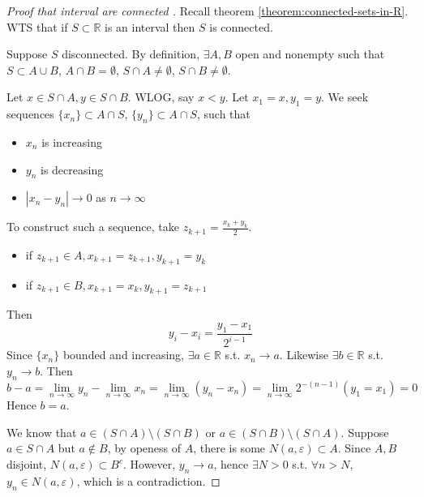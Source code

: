 \begin{proof}[Proof that interval are connected 
    \label{proof:connected-sets-in-R}]
    \medskip

    Recall theorem \ref{theorem:connected-sets-in-R}. 
    WTS that if $S \subset \mathbb{R}$ is an interval
    then $S$ is connected.
    \medskip

    Suppose $S$ disconnected. By definition, $\exists A, B$
    open and nonempty such that $S \subset A \cup B$,
    $A \cap B = \emptyset$,
    $S \cap A \neq \emptyset$,
    $S \cap B \neq \emptyset$.
    \medskip

    Let $x \in S \cap A, y \in S \cap B$. WLOG, say $x < y$.
    Let $x_1 = x, y_1 = y$. We seek sequences 
    $\{ x_n \} \subset A \cap S $,
    $\{ y_n \} \subset A \cap S $,
    such that 
    \begin{itemize}
        \item $x_n$ is increasing 
        \item $y_n$ is decreasing 
        \item $|x_n - y_n| \to 0$ as $n \to \infty$
    \end{itemize} 

    To construct such a sequence, take $z_{k + 1} = \frac{x_k + y_k}{2}$.
    \begin{itemize}
        \item if $z_{k + 1} \in A, x_{k + 1} = z_{k + 1}, y_{k + 1} = y_k$
        \item if $z_{k + 1} \in B, x_{k + 1} = x_k, y_{k + 1} = z_{k + 1}$
    \end{itemize} 
    Then 
    \[
        y_i - x_i = \frac{y_1 - x_1}{2^{i - 1}}
    \]
    Since $\{ x_n \} $ bounded and increasing, 
    $\exists a \in \mathbb{R}$ s.t. $x_n \to a$.
    Likewise
    $\exists b \in \mathbb{R}$ s.t. $y_n \to b$.
    Then
    \[
        b - a = 
        \lim_{n \to \infty} y_n - 
        \lim_{n \to \infty} x_n 
        = \lim_{n  \to \infty} (y_{n} - x_{n})
        = \lim_{n  \to \infty} 2^{-(n-1)}(y_1 = x_1)
        = 0
    \]
    Hence $b=a$.
    \medskip

    We know that $a \in (S \cap A) \setminus ( S \cap B)$ or 
    $a \in (S \cap B) \setminus (S \cap A)$. 
    Suppose $a \in S \cap A$ but $a \notin B$, by openess of $A$, 
    there is some $N(a, \varepsilon) \subset A$.
    Since $A, B$ disjoint, $N(a, \varepsilon) \subset B^c$. 
    However, $y_n \to a$, hence $\exists N>0$ s.t. $\forall n > N$,
    $y_n \in N(a, \varepsilon)$, which is a contradiction.
\end{proof}

